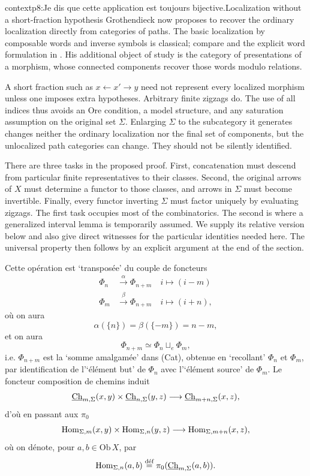 \begin{dcomment}{context}{p8:Je dis que cette application est toujours bijective.}{Localization without a short-fraction hypothesis}
Grothendieck now proposes to recover the ordinary localization directly from categories of paths. The basic localization by composable words and inverse symbols is classical; compare \citet[Chapter~I, pp.~6--21]{GabrielZisman1967} and the explicit word formulation in \citet[\S3.1--3.3]{DwyerKan1980Simplicial}. His additional object of study is the category of presentations of a morphism, whose connected components recover those words modulo relations.

A short fraction such as $x\leftarrow x'\to y$ need not represent every localized morphism unless one imposes extra hypotheses. Arbitrary finite zigzags do. The use of all indices thus avoids an Ore condition, a model structure, and any saturation assumption on the original set $\Sigma$. Enlarging $\Sigma$ to the subcategory it generates changes neither the ordinary localization nor the final set of components, but the unlocalized path categories can change. They should not be silently identified.

There are three tasks in the proposed proof. First, concatenation must descend from particular finite representatives to their classes. Second, the original arrows of $X$ must determine a functor to those classes, and arrows in $\Sigma$ must become invertible. Finally, every functor inverting $\Sigma$ must factor uniquely by evaluating zigzags. The first task occupies most of the combinatorics. The second is where a generalized interval lemma is temporarily assumed. We supply its relative version below and also give direct witnesses for the particular identities needed here. The universal property then follows by an explicit argument at the end of the section.
\end{dcomment}


Cette opération est `transposée' du couple de foncteurs
\[
\begin{aligned}
\Phi_n &\xrightarrow{\alpha} \Phi_{n+m}\quad i\longmapsto (i-m)\\
\Phi_m &\xrightarrow{\beta} \Phi_{n+m}\quad i\longmapsto (i+n),
\end{aligned}
\]
où on aura
\[
\alpha(\{n\})=\beta(\{-m\})=n-m,
\]
et on aura
\[
\Phi_{n+m}\simeq\Phi_n\sqcup_e\Phi_m,
\]
i.e. $\Phi_{n+m}$ est la `somme amalgamée' dans (Cat), obtenue en `recollant' $\Phi_n$ et $\Phi_m$, par identification de l'`élément but' de $\Phi_n$ avec l'`élément source' de $\Phi_m$. Le foncteur composition de chemins induit
\[
\underline{\mathrm{Ch}}_{m,\Sigma}(x,y)\times\underline{\mathrm{Ch}}_{n,\Sigma}(y,z)\longrightarrow\underline{\mathrm{Ch}}_{m+n,\Sigma}(x,z),
\]
d'où en passant aux $\pi_0$
\[
\mathrm{Hom}_{\Sigma,m}(x,y)\times\mathrm{Hom}_{\Sigma,n}(y,z)\longrightarrow\mathrm{Hom}_{\Sigma,m+n}(x,z),
\]
où on dénote, pour $a,b\in\mathrm{Ob}\,X$, par
\[
\mathrm{Hom}_{\Sigma,n}(a,b)\overset{\text{déf}}{=}\pi_0(\underline{\mathrm{Ch}}_{m,\Sigma}(a,b)).
\]



